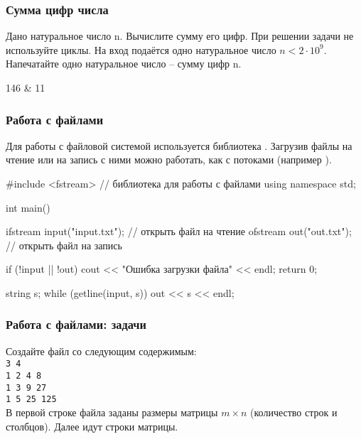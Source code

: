\begin{frame}
	\frametitle{Сумма цифр числа}
	Дано натуральное число n. Вычислите сумму его цифр. При решении задачи не
	используйте циклы.
	\inp
	На вход подаётся одно натуральное число $n < 2\cdot 10^9$.
	\out
	Напечатайте одно натуральное число -- сумму цифр n.
	\begin{ex}
		146 & 11\tb
	\end{ex}
\end{frame}

\begin{frame}[fragile]
	\frametitle{Работа с файлами}
Для работы с файловой системой используется библиотека . Загрузив
	файлы на чтение или на запись с ними можно работать, как с потоками
	(например ).
	\begin{code}
#include <fstream> // библиотека для работы с файлами
using namespace std;

int main()
{
	ifstream input("input.txt"); // открыть файл на чтение
	ofstream out("out.txt"); // открыть файл на запись

	if (!input || !out)
	{
		cout << "Ошибка загрузки файла" << endl;
		return 0;
	}

	string s;
	while (getline(input, s))
		out << s << endl;
}
	\end{code}
\end{frame}

\begin{frame}
	\frametitle{Работа с файлами: задачи}
	Создайте файл  со следующим содержимым:
	{\\ \tt 3 4 \\ 1 2 4 8 \\ 1 3 9 27 \\ 1 5 25 125 \\}
	В первой строке файла заданы размеры матрицы $m \times n$ (количество строк и
	столбцов). Далее идут строки матрицы. \\

\end{frame}


